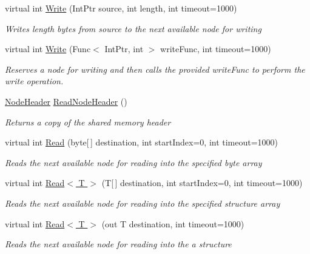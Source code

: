\begin{DoxyCompactItemize}
virtual int \hyperlink{class_shared_memory_1_1_circular_buffer_aa119f1d2ffcf73a1ceff6a2a4adc29a3}{Write} (Int\+Ptr source, int length, int timeout=1000)
\begin{DoxyCompactList}\small\item\em Writes {\itshape length}  bytes from {\itshape source}  to the next available node for writing \end{DoxyCompactList}\item 
virtual int \hyperlink{class_shared_memory_1_1_circular_buffer_aea9b35786dbdb15df6bb21e2e85fdb29}{Write} (Func$<$ Int\+Ptr, int $>$ write\+Func, int timeout=1000)
\begin{DoxyCompactList}\small\item\em Reserves a node for writing and then calls the provided {\itshape write\+Func}  to perform the write operation. \end{DoxyCompactList}\item 
\hyperlink{struct_shared_memory_1_1_circular_buffer_1_1_node_header}{Node\+Header} \hyperlink{class_shared_memory_1_1_circular_buffer_ad2c91fdb5a0fab9e89a2398a05354681}{Read\+Node\+Header} ()
\begin{DoxyCompactList}\small\item\em Returns a copy of the shared memory header \end{DoxyCompactList}\item 
virtual int \hyperlink{class_shared_memory_1_1_circular_buffer_a67667de3539376aee8411d68574764e1}{Read} (byte\mbox{[}$\,$\mbox{]} destination, int start\+Index=0, int timeout=1000)
\begin{DoxyCompactList}\small\item\em Reads the next available node for reading into the specified byte array \end{DoxyCompactList}\item 
virtual int \hyperlink{class_shared_memory_1_1_circular_buffer_ad58ea0beac997d6c4ad540f834fc54fb}{Read$<$ T $>$} (T\mbox{[}$\,$\mbox{]} destination, int start\+Index=0, int timeout=1000)
\begin{DoxyCompactList}\small\item\em Reads the next available node for reading into the specified structure array \end{DoxyCompactList}\item 
virtual int \hyperlink{class_shared_memory_1_1_circular_buffer_a8b66803c5cba5a40b9feb8f7e26b3fcd}{Read$<$ T $>$} (out T destination, int timeout=1000)
\begin{DoxyCompactList}\small\item\em Reads the next available node for reading into the a structure \end{DoxyCompactList}\item 

\end{DoxyCompactItemize}
